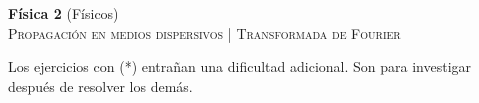 \documentclass[11pt,spanish,a4paper]{article}
\begin{document}
\begin{center}
\textbf{Física 2} (Físicos) \hfill {}\\
	\textsc{\LARGE Propagación en medios dispersivos | Transformada de Fourier}
\end{center}

Los ejercicios con (*) entrañan una dificultad adicional. Son para investigar después de resolver los demás.



\begin{enumerate}


}

}



\end{enumerate}
\end{document}
